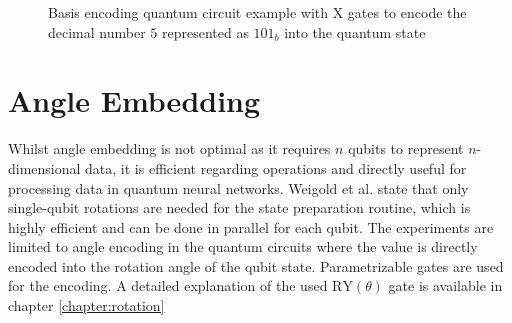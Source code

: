\begin{figure}[!h]
    \centering
    \caption{Basis encoding quantum circuit example with $\mathrm{X}$ gates to encode the decimal number $5$ represented as $101_b$ into the quantum state}
    \label{fig:basis_embedding_example}
\end{figure}

\section{Angle Embedding}\label{section:angle_embedding}

Whilst angle embedding is not optimal as it requires $n$ qubits to represent $n$-dimensional data, it is efficient regarding operations and directly useful for processing data in quantum neural networks\cite{Weigold2021_ExpandingDataEncodingPatterns,leymannBitterTruthGatebased2020}. Weigold et al. state that only single-qubit rotations are needed for the state preparation routine, which is highly efficient and can be done in parallel for each qubit. \break{}
The experiments are limited to angle encoding in the quantum circuits where the value is directly encoded into the rotation angle of the qubit state. Parametrizable gates\cite{qiskit_rygate_nodate} are used for the encoding. A detailed explanation of the used $\mathrm{RY}(\theta)$ gate is available in chapter \ref{chapter:rotation} \break{}
 
